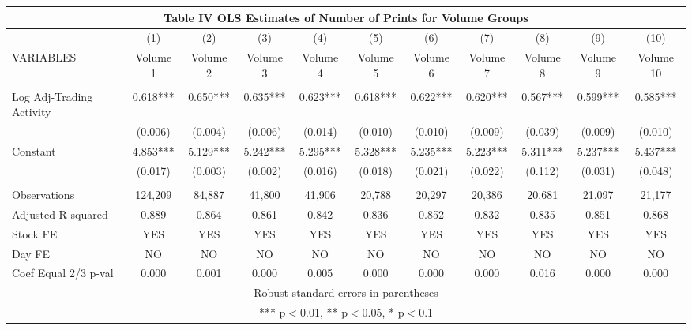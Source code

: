 \documentclass[12pt,a4paper]{article}
\begin{document}
\begin{landscape}
\begin{table}
\begin{center}
\footnotesize
\begin{tabular}{lcccccccccc}
\multicolumn{11}{c}{Table IV OLS Estimates of Number of Prints for Volume Groups} \\ \hline
 & (1) & (2) & (3) & (4) & (5) & (6) & (7) & (8) & (9) & (10) \\
VARIABLES & Volume 1 & Volume 2 & Volume 3 & Volume 4 & Volume 5 & Volume 6 & Volume 7 & Volume 8 & Volume 9 & Volume 10 \\ \hline
 &  &  &  &  &  &  &  &  &  &  \\
Log Adj-Trading Activity & 0.618*** & 0.650*** & 0.635*** & 0.623*** & 0.618*** & 0.622*** & 0.620*** & 0.567*** & 0.599*** & 0.585*** \\
 & (0.006) & (0.004) & (0.006) & (0.014) & (0.010) & (0.010) & (0.009) & (0.039) & (0.009) & (0.010) \\
Constant & 4.853*** & 5.129*** & 5.242*** & 5.295*** & 5.328*** & 5.235*** & 5.223*** & 5.311*** & 5.237*** & 5.437*** \\
 & (0.017) & (0.003) & (0.002) & (0.016) & (0.018) & (0.021) & (0.022) & (0.112) & (0.031) & (0.048) \\
 &  &  &  &  &  &  &  &  &  &  \\
Observations & 124,209 & 84,887 & 41,800 & 41,906 & 20,788 & 20,297 & 20,386 & 20,681 & 21,097 & 21,177 \\
Adjusted R-squared & 0.889 & 0.864 & 0.861 & 0.842 & 0.836 & 0.852 & 0.832 & 0.835 & 0.851 & 0.868 \\
Stock FE & YES & YES & YES & YES & YES & YES & YES & YES & YES & YES \\
Day FE & NO & NO & NO & NO & NO & NO & NO & NO & NO & NO \\
 Coef Equal 2/3 p-val & 0.000 & 0.001 & 0.000 & 0.005 & 0.000 & 0.000 & 0.000 & 0.016 & 0.000 & 0.000 \\ \hline
\multicolumn{11}{c}{ Robust standard errors in parentheses} \\
\multicolumn{11}{c}{ *** p$<$0.01, ** p$<$0.05, * p$<$0.1} \\
\end{tabular}
\end{center}
\end{table}
\end{landscape}
\end{document}
